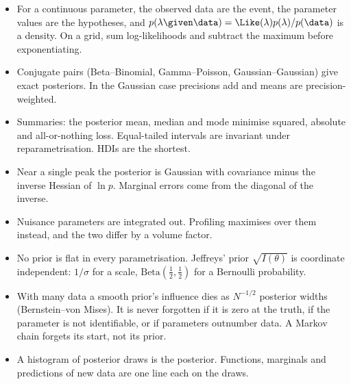 \begin{recap}
\begin{itemize}
  \item For a continuous parameter, the observed data are the event, the parameter values
        are the hypotheses, and $p(\lambda\given\data)=\Like(\lambda)p(\lambda)/p(\data)$
        is a density. On a grid, sum log-likelihoods and subtract the maximum before
        exponentiating.
  \item Conjugate pairs (Beta--Binomial, Gamma--Poisson, Gaussian--Gaussian) give exact
        posteriors. In the Gaussian case precisions add and means are
        precision-weighted.
  \item Summaries: the posterior mean, median and mode minimise squared, absolute and
        all-or-nothing loss. Equal-tailed intervals are invariant under reparametrisation.
        HDIs are the shortest.
  \item Near a single peak the posterior is Gaussian with covariance minus the inverse
        Hessian of $\ln p$. Marginal errors come from the diagonal of the inverse.
  \item Nuisance parameters are integrated out. Profiling maximises over them instead, and
        the two differ by a volume factor.
  \item No prior is flat in every parametrisation. Jeffreys' prior $\sqrt{I(\theta)}$ is
        coordinate independent: $1/\sigma$ for a scale, $\mathrm{Beta}(\frac12,\frac12)$
        for a Bernoulli probability.
  \item With many data a smooth prior's influence dies as $N^{-1/2}$ posterior widths
        (Bernstein--von Mises). It is never forgotten if it is zero at the truth, if the
        parameter is not identifiable, or if parameters outnumber data. A Markov chain
        forgets its start, not its prior.
  \item A histogram of posterior draws is the posterior. Functions, marginals and
        predictions of new data are one line each on the draws.
\end{itemize}
\end{recap}


